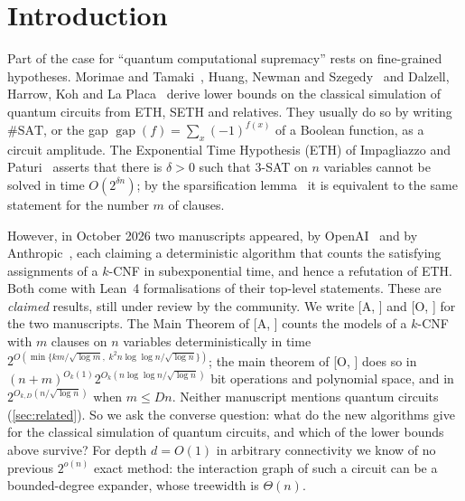 \documentclass[10pt]{amsart}
\theoremstyle{plain}
\theoremstyle{definition}
\theoremstyle{remark}
\numberwithin{equation}{section}
\newcommand{\gap}{\operatorname{gap}}
\newcommand{\A}[1][]{\textup{[A\if\relax\detokenize{#1}\relax\else, #1\fi]}}
\newcommand{\Oa}[1][]{\textup{[O\if\relax\detokenize{#1}\relax\else, #1\fi]}}
\begin{document}
\maketitle


\section{Introduction}\label{sec:intro}

Part of the case for ``quantum computational supremacy'' rests on fine-grained hypotheses.
Morimae and Tamaki~\cite{MT19a,MT19b,MT20}, Huang, Newman and Szegedy~\cite{HNS18,HNS19} and
Dalzell, Harrow, Koh and La Placa~\cite{DHKL20} derive lower bounds on the classical simulation of
quantum circuits from ETH, SETH and relatives. They usually do so by writing $\#\mathrm{SAT}$, or the
gap $\gap(f)=\sum_x(-1)^{f(x)}$ of a Boolean function, as a circuit amplitude.
The Exponential Time Hypothesis (ETH) of Impagliazzo and Paturi~\cite{ImpagliazzoPaturi01}
asserts that there is $\delta>0$ such that $3$-SAT on $n$ variables cannot be solved in time
$O(2^{\delta n})$; by the sparsification lemma~\cite{IPZ01} it is equivalent to the same statement
for the number $m$ of clauses.

However, in October 2026 two manuscripts appeared, by OpenAI~\cite{OpenAI26} and by
Anthropic~\cite{Anthropic26}, each claiming a deterministic algorithm that counts the satisfying
assignments of a $k$-CNF in subexponential time, and hence a refutation of ETH. Both come with
Lean~4 formalisations of their top-level statements. These are \emph{claimed} results, still
under review by the community. We write \A{} and \Oa{} for the two manuscripts. The Main Theorem
of \A{} counts the models of a $k$-CNF with $m$ clauses on $n$ variables deterministically in time
$2^{O(\min\{km/\sqrt{\log m},\;k^2n\log\log n/\sqrt{\log n}\})}$; the main theorem of \Oa{} does
so in $(n+m)^{O_k(1)}2^{O_k(n\log\log n/\sqrt{\log n})}$ bit operations and polynomial space, and
in $2^{O_{k,D}(n/\sqrt{\log n})}$ when $m\le Dn$.
Neither manuscript mentions quantum circuits (\cref{sec:related}). So we ask the converse question:
what do the new algorithms give for the classical simulation of quantum circuits, and which of the
lower bounds above survive? For depth $d=O(1)$ in arbitrary connectivity we know of no previous
$2^{o(n)}$ exact method: the interaction graph of such a circuit can be a bounded-degree expander,
whose treewidth is $\Theta(n)$.
\end{document}
